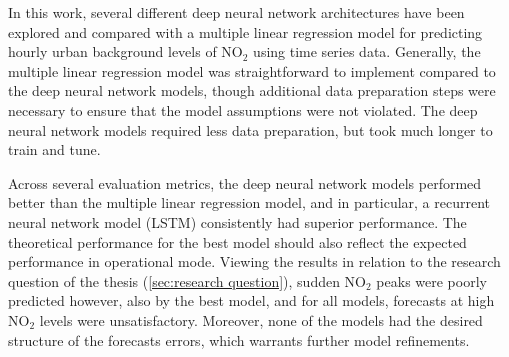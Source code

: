 



In this work, several different deep neural network architectures have been explored and compared with a multiple linear regression model for predicting hourly urban background levels of NO$_2$ using time series data. Generally, the multiple linear regression model was straightforward to implement compared to the deep neural network models, though additional data preparation steps were necessary to ensure that the model assumptions were not violated. The deep neural network models required less data preparation, but took much longer to train and tune. 

Across several evaluation metrics, the deep neural network models performed better than the multiple linear regression model, and in particular, a recurrent neural network model (LSTM) consistently had superior performance. The theoretical performance for the best model should also reflect the expected performance in operational mode. Viewing the results in relation to the research question of the thesis (\cref{sec:research question}), sudden NO$_2$ peaks were poorly predicted however, also by the best model, and for all models, forecasts at high NO$_2$ levels were unsatisfactory. Moreover, none of the models had the desired structure of the forecasts errors, which warrants further model refinements. 

